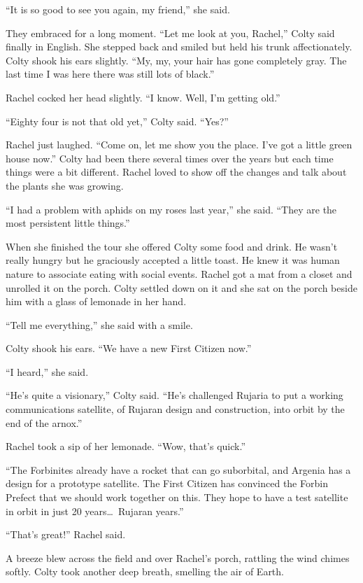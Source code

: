 ``It is so good to see you again, my friend,'' she said.

They embraced for a long moment. ``Let me look at you, Rachel,'' Colty said finally in English.
She stepped back and smiled but held his trunk affectionately. Colty shook his ears slightly.
``My, my, your hair has gone completely gray. The last time I was here there was still lots of
black.''

Rachel cocked her head slightly. ``I know. Well, I'm getting old.''

``Eighty four is not that old yet,'' Colty said. ``Yes?''

Rachel just laughed. ``Come on, let me show you the place. I've got a little green house now.''
Colty had been there several times over the years but each time things were a bit different.
Rachel loved to show off the changes and talk about the plants she was growing.

``I had a problem with aphids on my roses last year,'' she said. ``They are the most persistent
little things.''

When she finished the tour she offered Colty some food and drink. He wasn't really hungry but he
graciously accepted a little toast. He knew it was human nature to associate eating with social
events. Rachel got a mat from a closet and unrolled it on the porch. Colty settled down on it
and she sat on the porch beside him with a glass of lemonade in her hand.

``Tell me everything,'' she said with a smile.

Colty shook his ears. ``We have a new First Citizen now.''

``I heard,'' she said.

``He's quite a visionary,'' Colty said. ``He's challenged Rujaria to put a working
communications satellite, of Rujaran design and construction, into orbit by the end of the
arnox.''

Rachel took a sip of her lemonade. ``Wow, that's quick.''

``The Forbinites already have a rocket that can go suborbital, and Argenia has a design for a
prototype satellite. The First Citizen has convinced the Forbin Prefect that we should work
together on this. They hope to have a test satellite in orbit in just 20 years\ldots\ Rujaran
years.''

``That's great!'' Rachel said.

A breeze blew across the field and over Rachel's porch, rattling the wind chimes softly. Colty
took another deep breath, smelling the air of Earth.

